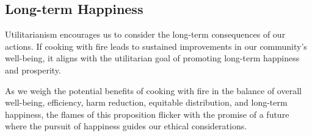 \subsection{Long-term Happiness}
Utilitarianism encourages us to consider the long-term consequences of our actions. If cooking with fire leads to sustained improvements in our community's well-being, it aligns with the utilitarian goal of promoting long-term happiness and prosperity.

As we weigh the potential benefits of cooking with fire in the balance of overall well-being, efficiency, harm reduction, equitable distribution, and long-term happiness, the flames of this proposition flicker with the promise of a future where the pursuit of happiness guides our ethical considerations.